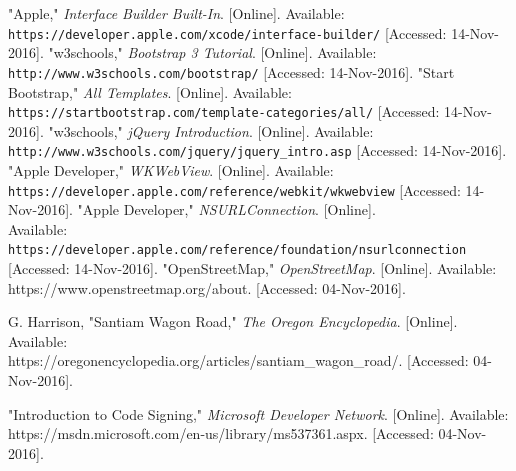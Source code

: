 \documentclass[letterpaper, 10pt,titlepage]{article}
\begin{document}
\newpage %
\begin{thebibliography}{15}

"Apple," \textit{Interface Builder Built-In}. [Online]. Available:
\texttt{https://developer.apple.com/xcode/interface-builder/} [Accessed: 14-Nov-2016].
"w3schools," \textit{Bootstrap 3 Tutorial}. [Online]. Available:
\texttt{http://www.w3schools.com/bootstrap/} [Accessed: 14-Nov-2016].
"Start Bootstrap," \textit{All Templates}. [Online]. Available:
\texttt{https://startbootstrap.com/template-categories/all/} [Accessed: 14-Nov-2016].
"w3schools," \textit{jQuery Introduction}. [Online]. Available:
\texttt{http://www.w3schools.com/jquery/jquery\_intro.asp} [Accessed: 14-Nov-2016].
"Apple Developer," \textit{WKWebView}. [Online]. Available:
\texttt{https://developer.apple.com/reference/webkit/wkwebview} [Accessed: 14-Nov-2016].
"Apple Developer," \textit{NSURLConnection}. [Online]. 
\\Available: \texttt{https://developer.apple.com/reference/foundation/nsurlconnection} [Accessed: 14-Nov-2016].
"OpenStreetMap," \textit{OpenStreetMap}. [Online]. Available: https://www.openstreetmap.org/about. [Accessed: 04-Nov-2016]. \par

G. Harrison, "Santiam Wagon Road," \textit{The Oregon Encyclopedia}. [Online]. Available: \\ https://oregonencyclopedia.org/articles/santiam\_wagon\_road/. [Accessed: 04-Nov-2016]. \par

"Introduction to Code Signing," \textit{Microsoft Developer Network}. [Online]. Available: \\ https://msdn.microsoft.com/en-us/library/ms537361.aspx. [Accessed: 04-Nov-2016]. \par


\end{thebibliography}
\end{document}
